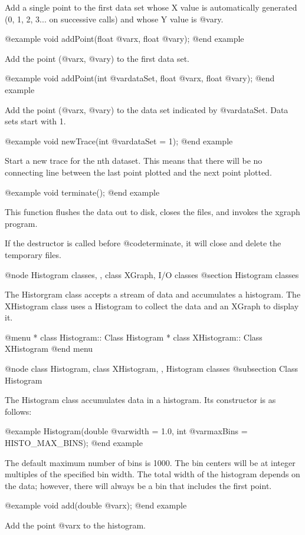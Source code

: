Add a single point to the first data set whose X value is
automatically generated (0, 1, 2, 3... on successive calls)
and whose Y value is @var{y}.

@example
void addPoint(float @var{x}, float @var{y});
@end example

Add the point (@var{x}, @var{y}) to the first data set.

@example
void addPoint(int @var{dataSet}, float @var{x}, float @var{y});
@end example

Add the point (@var{x}, @var{y}) to the data set indicated by
@var{dataSet}.  Data sets start with 1.

@example
void newTrace(int @var{dataSet} = 1);
@end example

Start a new trace for the nth dataset.  This means that there will be
no connecting line between the last point plotted and the next point
plotted.

@example
void terminate();
@end example

This function flushes the data out to disk, closes the files, and
invokes the xgraph program.

If the destructor is called before @code{terminate}, it will close and
delete the temporary files.

@node Histogram classes,  , class XGraph, I/O classes
@section Histogram classes

The Historgram class accepts a stream of data and accumulates a
histogram.  The XHistogram class uses a Histogram to collect the
data and an XGraph to display it.

@menu
* class Histogram::  Class Histogram
* class XHistogram::  Class XHistogram
@end menu

@node class Histogram, class XHistogram,  , Histogram classes
@subsection Class Histogram

The Histogram class accumulates data in a histogram.  Its constructor
is as follows:

@example
Histogram(double @var{width} = 1.0, int @var{maxBins} = HISTO_MAX_BINS);
@end example

The default maximum number of bins is 1000.  The bin centers will be at
integer multiples of the specified bin width.  The total width of the
histogram depends on the data; however, there will always be a bin that
includes the first point.

@example
void add(double @var{x});
@end example

Add the point @var{x} to the histogram.

